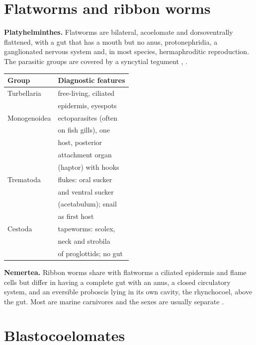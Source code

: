 \section{Flatworms and ribbon worms}
\label{section-acoelomates}

\textbf{Platyhelminthes.} Flatworms are
bilateral, acoelomate and dorsoventrally
flattened, with a gut that has a mouth but no
anus, protonephridia, a ganglionated nervous
system and, in most species, hermaphroditic
reproduction. The parasitic groups are
covered by a syncytial tegument \cite[Chapter
8]{hickman2002animal},
\cite{garciaprieto2014platyhelminthes}.

\begin{center}
\begin{tabular}{ll}
Group & Diagnostic features \\
\hline
Turbellaria & free-living, ciliated \\
& epidermis, eyespots \\
Monogenoidea & ectoparasites (often \\
& on fish gills), one \\
& host, posterior \\
& attachment organ \\
& (haptor) with hooks \\
Trematoda & flukes: oral sucker \\
& and ventral sucker \\
& (acetabulum); snail \\
& as first host \\
Cestoda & tapeworms: scolex, \\
& neck and strobila \\
& of proglottids; no gut \\
\end{tabular}
\end{center}

\textbf{Nemertea.} Ribbon worms share with
flatworms a ciliated epidermis and flame
cells but differ in having a complete gut
with an anus, a closed circulatory system,
and an eversible proboscis lying in its own
cavity, the rhynchocoel, above the gut. Most
are marine carnivores and the sexes are
usually separate \cite[Chapter
8]{hickman2002animal}.

\section{Blastocoelomates}
\label{section-blastocoelomates}

